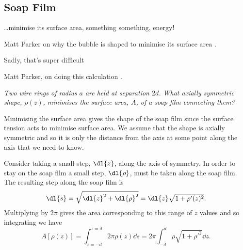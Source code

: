 \documentclass[fleqn]{NotesClass}
\begin{document}
    \subsection{Soap Film}
    \epigraph{\ldots minimise its surface area, something something, energy!}{Matt Parker on why the bubble is shaped to minimise its surface area \cite{parker2021}.}
    \epigraph{Sadly, that's super difficult}{Matt Parker, on doing this calculation \cite{parker2021}.}
    \textit{Two wire rings of radius \(a\) are held at separation \(2d\). What axially symmetric shape, \(\rho(z)\), minimises the surface area, \(A\), of a soap film connecting them?}
    
    \begin{rmk}
        Minimising the surface area gives the shape of the soap film since the surface tension acts to minimise surface area. We assume that the shape is axially symmetric and so it is only the distance from the axis at some point along the axis that we need to know.
    \end{rmk}
    
    Consider taking a small step, \(\dl{z}\), along the axis of symmetry.
    In order to stay on the soap film a small step, \(\dl{\rho}\), must be taken along the soap film.
    The resulting step along the soap film is
    \begin{equation}
        \dl{s} = \sqrt{\dl{z}^2 + \dl{\rho}^2} = \dl{z} \sqrt{1 + \rho'(z)^2}.
    \end{equation}
    Multiplying by \(2\pi\) gives the area corresponding to this range of \(z\) values and so integrating we have
    \begin{equation}
        A[\rho(z)] = \int_{z=-d}^{z=d} 2\pi \rho(z) \dd{s} = 2\pi \int_{-d}^{d} \rho\sqrt{1 + \rho'^2} \dd{z}.
    \end{equation}
\end{document}
